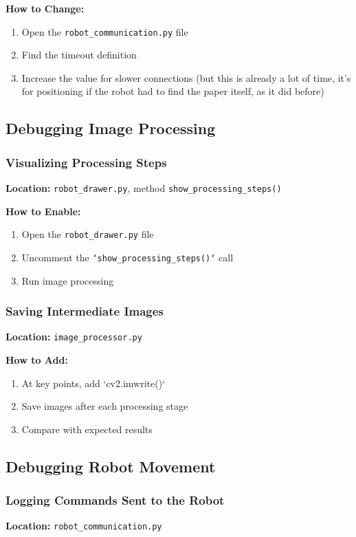 \documentclass[a4paper,12pt]{article}
\begin{document}
\textbf{How to Change:}
\begin{enumerate}
\item Open the \texttt{robot\_communication.py} file
\item Find the timeout definition
\item Increase the value for slower connections (but this is already a lot of time, it's for positioning if the robot had to find the paper itself, as it did before)
\end{enumerate}

\subsection{Debugging Image Processing}

\subsubsection{Visualizing Processing Steps}
\textbf{Location:} \texttt{robot\_drawer.py}, method \texttt{show\_processing\_steps()}

\textbf{How to Enable:}
\begin{enumerate}
\item Open the \texttt{robot\_drawer.py} file
\item Uncomment the \texttt{`show\_processing\_steps()`} call
\item Run image processing
\end{enumerate}

\subsubsection{Saving Intermediate Images}
\textbf{Location:} \texttt{image\_processor.py}

\textbf{How to Add:}
\begin{enumerate}
\item At key points, add `cv2.imwrite()`
\item Save images after each processing stage
\item Compare with expected results
\end{enumerate}

\subsection{Debugging Robot Movement}

\subsubsection{Logging Commands Sent to the Robot}
\textbf{Location:} \texttt{robot\_communication.py}
\end{document}
